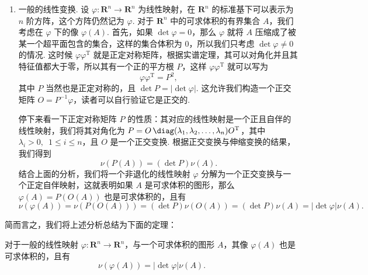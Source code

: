 \begin{enumerate}[label=(\arabic*)]
          \begin{theorem}{}{}
              正交变换保持体积不变.
          \end{theorem}

          \begin{proof}
              注意到正交变换将 $n$ 维球映为 $n$ 维球，且球的半径不变，进而其体积不变. 根据第二覆盖引理，正交变换将零体积映为零体积集. 再注意到正交变换将集合的边界点映射为边界点，内点映射为内点，因此将可求体积的集合映为可求体积的集合. 再由覆盖引理及其正交变换保持球体体积变则可知正交变换保持可求体积的集合的体积不变.
          \end{proof}

    \item 一般的线性变换. 设 $\varphi\colon \mathbf{R}^n\to \mathbf{R}^n$ 为线性映射，在 $\mathbf{R}^n$ 的标准基下可以表示为 $n$ 阶方阵，这个方阵仍然记为 $\varphi$. 对于 $\mathbf{R}^n$ 中的可求体积的有界集合 $A$，我们考虑在 $\varphi$ 下的像 $\varphi(A)$. 首先，如果 $\det\varphi = 0$，那么 $\varphi$ 就将 $A$ 压缩成了被某一个超平面包含的集合，这样的集合体积为 $0$，所以我们只考虑 $\det\varphi\neq 0$ 的情况. 这时候 $\varphi\varphi^\mathrm{T}$ 就是正定对称矩阵，根据实谱定理，其可以对角化并且其特征值都大于零，所以其有一个正的平方根 $P$，这样 $\varphi\varphi^\mathrm{T}$ 就可以写为 \[\varphi\varphi^\mathrm{T} = P^2,\]
          其中 $P$ 当然也是正定对称的，且 $\det P = \lvert\det\varphi\rvert$. 这允许我们构造一个正交矩阵 $O = P^{-1}\varphi$，读者可以自行验证它是正交的.

          停下来看一下正定对称矩阵 $P$ 的性质：其对应的线性映射是一个正且自伴的线性映射，我们将其对角化为 $P = O\,\diag(\lambda_1, \lambda_2, \ldots, \lambda_n) O^\mathrm{T}$，其中 $\lambda_i > 0,\enspace 1\leqslant i\leqslant n$，且 $O$ 是一个正交变换. 根据正交变换与伸缩变换的结果，我们得到 \[\nu(P(A)) = (\det P)\nu(A).\]
          结合上面的分析，我们将一个非退化的线性映射 $\varphi$ 分解为一个正交变换与一个正定自伴映射，这就表明如果 $A$ 是可求体积的图形，那么 $\varphi(A) = P(O(A))$ 也是可求体积的，且有 \[\nu(\varphi(A)) = \nu(P(O(A))) = (\det P)\nu(O(A)) = (\det P)\nu(A) = \lvert\det\varphi\rvert \nu(A).\]
\end{enumerate}
简而言之，我们将上述分析总结为下面的定理：

\begin{theorem}{}{}
    对于一般的线性映射 $\varphi\colon \mathbf{R}^n\to \mathbf{R}^n$，与一个可求体积的图形 $A$，其像 $\varphi(A)$ 也是可求体积的，且有 \[\nu(\varphi(A)) = \lvert\det\varphi\rvert \nu(A).\]
\end{theorem}

